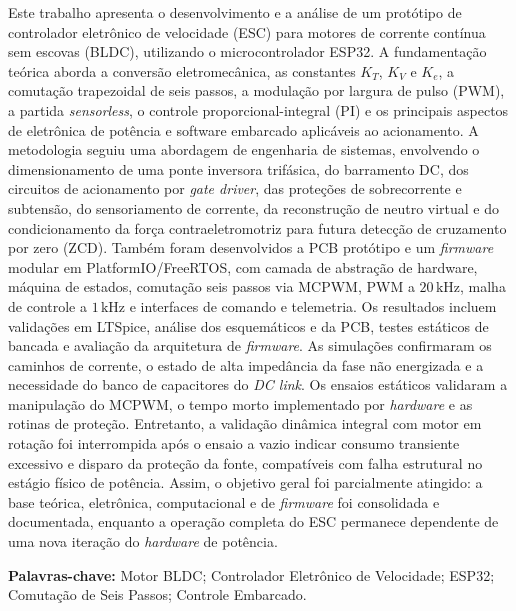 \documentclass[12pt, a4paper, openright, oneside, chapter=TITLE, brazilian]{abntex2}
\begin{document}
\begin{resumo}
    Este trabalho apresenta o desenvolvimento e a análise de um protótipo de controlador eletrônico de velocidade (ESC) para motores de corrente contínua sem escovas (BLDC), utilizando o microcontrolador ESP32. A fundamentação teórica aborda a conversão eletromecânica, as constantes $K_T$, $K_V$ e $K_e$, a comutação trapezoidal de seis passos, a modulação por largura de pulso (PWM), a partida \textit{sensorless}, o controle proporcional-integral (PI) e os principais aspectos de eletrônica de potência e software embarcado aplicáveis ao acionamento. A metodologia seguiu uma abordagem de engenharia de sistemas, envolvendo o dimensionamento de uma ponte inversora trifásica, do barramento DC, dos circuitos de acionamento por \textit{gate driver}, das proteções de sobrecorrente e subtensão, do sensoriamento de corrente, da reconstrução de neutro virtual e do condicionamento da força contraeletromotriz para futura detecção de cruzamento por zero (ZCD). Também foram desenvolvidos a PCB protótipo e um \textit{firmware} modular em PlatformIO/FreeRTOS, com camada de abstração de hardware, máquina de estados, comutação seis passos via MCPWM, PWM a $20\,\text{kHz}$, malha de controle a $1\,\text{kHz}$ e interfaces de comando e telemetria. Os resultados incluem validações em LTSpice, análise dos esquemáticos e da PCB, testes estáticos de bancada e avaliação da arquitetura de \textit{firmware}. As simulações confirmaram os caminhos de corrente, o estado de alta impedância da fase não energizada e a necessidade do banco de capacitores do \textit{DC link}. Os ensaios estáticos validaram a manipulação do MCPWM, o tempo morto implementado por \textit{hardware} e as rotinas de proteção. Entretanto, a validação dinâmica integral com motor em rotação foi interrompida após o ensaio a vazio indicar consumo transiente excessivo e disparo da proteção da fonte, compatíveis com falha estrutural no estágio físico de potência. Assim, o objetivo geral foi parcialmente atingido: a base teórica, eletrônica, computacional e de \textit{firmware} foi consolidada e documentada, enquanto a operação completa do ESC permanece dependente de uma nova iteração do \textit{hardware} de potência.
    \par\vspace{\onelineskip}
    \noindent\textbf{Palavras-chave:} Motor BLDC; Controlador Eletrônico de Velocidade; ESP32; Comutação de Seis Passos; Controle Embarcado.
\end{resumo}
\end{document}
